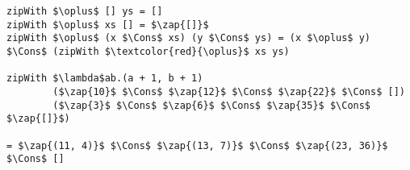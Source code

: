 \begin{frame}[fragile]


\begin{lstlisting}[mathescape=true,numbers=none]
zipWith $\oplus$ [] ys = []
zipWith $\oplus$ xs [] = $\zap{[]}$
zipWith $\oplus$ (x $\Cons$ xs) (y $\Cons$ ys) = (x $\oplus$ y) $\Cons$ (zipWith $\textcolor{red}{\oplus}$ xs ys)

zipWith $\lambda$ab.(a + 1, b + 1)
        ($\zap{10}$ $\Cons$ $\zap{12}$ $\Cons$ $\zap{22}$ $\Cons$ [])
        ($\zap{3}$ $\Cons$ $\zap{6}$ $\Cons$ $\zap{35}$ $\Cons$ $\zap{[]}$)

= $\zap{(11, 4)}$ $\Cons$ $\zap{(13, 7)}$ $\Cons$ $\zap{(23, 36)}$ $\Cons$ []
\end{lstlisting}

\end{frame}
